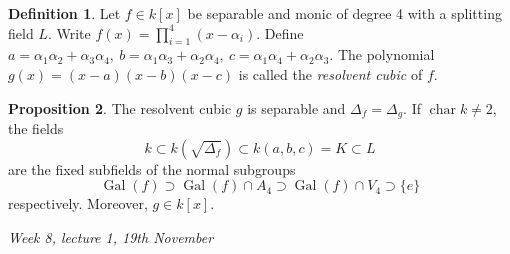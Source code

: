 \documentclass{article}
\newcommand{\Char}{\operatorname{char}}
\newcommand{\Gal}{\operatorname{Gal}}
\theoremstyle{definition}
\newtheorem{defn}{Definition}[subsection]
\newtheorem{prop}[defn]{Proposition}
\begin{document}
\begin{defn}
Let $f\in k[x]$ be separable and monic of degree 4 with a splitting field $L$. Write $f(x)=\prod_{i=1}^4(x-\alpha_i)$. Define $a=\alpha_1\alpha_2+\alpha_3\alpha_4,\ b=\alpha_1\alpha_3+\alpha_2\alpha_4,\ c=\alpha_1\alpha_4+\alpha_2\alpha_3$. The polynomial $g(x)=(x-a)(x-b)(x-c)$ is called the \textit{resolvent cubic} of $f$.
\end{defn}

\begin{prop}
The resolvent cubic $g$ is separable and $\Delta_f=\Delta_g$. If $\Char k\neq 2$, the fields
\[
k\subset k\left(\sqrt{\Delta_f}\right)\subset k(a,b,c)=K\subset L
\]
are the fixed subfields of the normal subgroups
\[
\Gal(f)\supset \Gal(f)\cap A_4 \supset \Gal(f)\cap V_4\supset\{e\}
\]
respectively. Moreover, $g\in k[x]$.
\end{prop}

\begin{flushright}
\textit{Week 8, lecture 1, 19th November}
\end{flushright}
\end{document}
